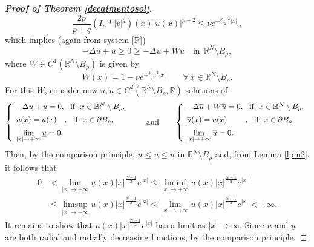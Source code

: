 \documentclass[12pt,a4paper]{article}
\numberwithin{equation}{section}
\begin{document}
\begin{proof}[\textbf{Proof of Theorem \ref{decaimentosol}}]
    $$
    \dfrac{2p}{p+q}(I_\alpha \ast |v|^q)(x)|u(x)|^{p-2}\leq \nu e^{-\frac{p-2}{2}|x|}\,, 
    $$
    which implies (again from system \eqref{P})
    $$
    -\Delta u + u \geq 0 \geq -\Delta u + W u \quad \text{in} \ \  \mathbb{R}^N \setminus B_\rho,
    $$
    where $W \in C^1 (\mathbb{R}^N \setminus B_\rho)$ is given by 
    $$
    W(x) = 1 - \nu e^{-\frac{p-2}{2}|x|} \qquad \forall \, x\in \mathbb{R}^N \setminus B_\rho.
    $$
    For this $W$, consider now $\underline{u}, \overline{u}\in C^2(\mathbb{R}^N \setminus B_\rho, \mathbb{R})$ solutions of
    $$
    \left\{
    \begin{array}{lll}
         -\Delta \underline{u}+ \underline{u}= 0, \mbox{ \ if \ } x \in \mathbb{R}^N \setminus B_\rho, \vspace{5pt}\\
        \underline{u}(x) = u(x) \ \ \ ,  \mbox{ \ if \ } x \in \partial B_\rho, \vspace{5pt}\\
        \lim\limits_{|x|\rightarrow + \infty}\underline{u} = 0,
    \end{array}
    \right.
  \qquad \text{and} \qquad
    \left\{
    \begin{array}{lll}
         -\Delta \overline{u}+ W\overline{u}= 0, \mbox{ \ if \ } x \in \mathbb{R}^N \setminus B_\rho, \vspace{5pt}\\
        \overline{u}(x) = u(x) \ \ \ \ \ \ \ ,  \mbox{ \ if \ } x \in \partial B_\rho, \vspace{5pt}\\
        \lim\limits_{|x|\rightarrow + \infty}\overline{u} = 0.
    \end{array}
    \right.
    $$
    Then, by the comparison principle, $\underline{u}\leq u \leq \overline{u}$ in $\mathbb{R}^N \setminus B_\rho$ and, from Lemma \ref{lpm2}, it follows that
    \begin{align}\label{eqlim}
        0 & < \lim\limits_{|x|\rightarrow +\infty}\underline{u}(x)|x|^{\frac{N-1}{2}}e^{|x|} \leq \liminf\limits_{|x|\rightarrow + \infty} u(x)|x|^{\frac{N-1}{2}}e^{|x|} \nonumber \\
        &\leq \limsup\limits_{|x|\rightarrow + \infty} u(x)|x|^{\frac{N-1}{2}}e^{|x|} \leq \lim\limits_{|x|\rightarrow +\infty}\overline{u}(x)|x|^{\frac{N-1}{2}}e^{|x|}<+\infty.
    \end{align}
    It remains to show that $u(x)|x|^{\frac{N-1}{2}}e^{|x|}$ has a limit as $|x|\to \infty$. Since $u$ and $\underline{u}$ are both radial and radially decreasing functions, by the comparison principle,

\end{proof}
\end{document}
